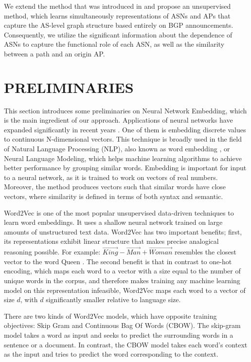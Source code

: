 \documentclass[10pt,journal]{IEEEtran}
\begin{document}
We extend the method that was introduced in \cite{shapira2020deep} and propose an unsupervised method, which learns simultaneously representations of ASNs and APs that capture the AS-level graph structure based entirely on BGP announcements. Consequently, we utilize the significant information about the dependence of ASNs to capture the functional role of each ASN, as well as the similarity between a path and an origin AP.

\section{PRELIMINARIES}
This section introduces some preliminaries on Neural Network Embedding, which is the main ingredient of our approach. Applications of neural networks have expanded significantly in recent years \cite{lecun2015deep}. One of them is embedding discrete values to continuous N-dimensional vectors. This technique is broadly used in the field of Natural Language Processing (NLP), also known as word embedding \cite{mikolov2013distributed}, \cite{mikolov2013efficient} or Neural Language Modeling, which helps machine learning algorithms to achieve better performance by grouping similar words. Embedding is important for input to a neural network, as it is trained to work on vectors of real numbers. Moreover, the method produces vectors such that similar words have close vectors, where similarity is defined in terms of both syntax and semantic.

Word2Vec \cite{mikolov2013distributed} is one of the most popular unsupervised data-driven techniques to learn word embeddings. It uses a shallow neural network trained on large amounts of unstructured text data. Word2Vec has two important benefits; first, its representations exhibit linear structure that makes precise analogical reasoning possible. For example: $\overrightarrow{King} - \overrightarrow{Man} + \overrightarrow{Woman}$ resembles the closest vector to the word Queen \cite{mikolov2013efficient}. The second benefit is that in contrast to one-hot encoding, which maps each word to a vector with a size equal to the number of unique words in the corpus, and therefore makes training any machine learning model on this representation infeasible, Word2Vec maps each word to a vector of size $d$, with $d$ significantly smaller relative to language size.

There are two kinds of Word2Vec models, which have opposite training objectives: Skip Gram and Continuous Bag Of Words (CBOW). The skip-gram model takes a word as input and seeks to predict the surrounding words in a sentence or a document. In contrast, the CBOW model takes each word's context as the input and tries to predict the word corresponding to the context.
\end{document}
